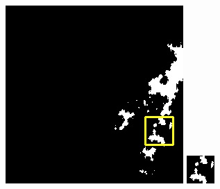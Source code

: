 \documentclass[10pt,UTF8,fntef]{ctexart}
\begin{document}
\begin{figure}[H]
{{\begin{minipage}[b]{0.15\linewidth}
            \includegraphics[width=1\linewidth]{../log/spoon3/cut/LC81570452014213LGN00_06142_mask.jpg}\vspace{4pt}
            \includegraphics[width=1\linewidth]{../log/spoon3/cut/tmp_cut_LC81570452014213LGN00_06142_mask.jpg}\vspace{4pt}

\end{minipage}}}
\end{figure}
\end{document}
